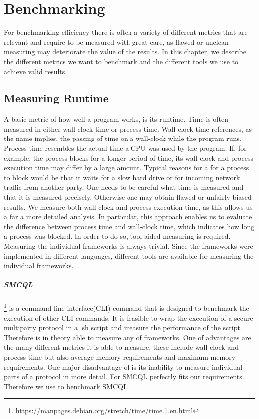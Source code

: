 	
\chapter{Benchmarking}
\label{Benchmarking}
For benchmarking efficiency there is often a variety of different metrics that are relevant and require to be measured with great care, as flawed or unclean measuring may deteriorate the value of the results. In this chapter, we describe the different metrics we want to benchmark and the different tools we use to achieve valid results. 

\section{Measuring Runtime}
A basic metric of how well a program works, is its runtime. Time is often measured in either wall-clock time or process time. Wall-clock time references, as the name implies, the passing of time on a wall-clock while the program runs. 
Process time resembles the actual time a CPU was used by the program. If, for example, the process blocks for a longer period of time, its wall-clock and process execution time may differ by a large amount. Typical reasons for a for a process to block would be that it waits for a slow hard drive or for incoming network traffic from another party. One needs to be careful what time is measured and that it is measured precisely. Otherwise one may obtain flawed or unfairly biased results. We measure both wall-clock and process execution time, as this allows us a far a more detailed analysis. In particular, this approach enables us to evaluate the difference between process time and wall-clock time, which indicates how long a process was blocked. In order to do so, tool-aided measuring is required. Measuring the individual frameworks is always trivial. Since the frameworks were implemented in different languages, different tools are available for measuring the individual frameworks. 
\label{time}	
\paragraph{SMCQL}%
\footnote{https://manpages.debian.org/stretch/time/time.1.en.html} is a command line interface(CLI) command that is designed to benchmark the execution of other CLI commands. It is feasible to wrap the execution of a secure multiparty protocol in a .sh script and measure the performance of the script. Therefore  is in theory able to measure any of frameworks. One of  advantages are the many different metrics it is able to measure, these include wall-clock and process time but also average memory requirements and maximum memory requirements. One major disadvantage of  is its inability to measure individual parts of a protocol in more detail. For SMCQL  perfectly fits our requirements. Therefore we use  to benchmark SMCQL  



